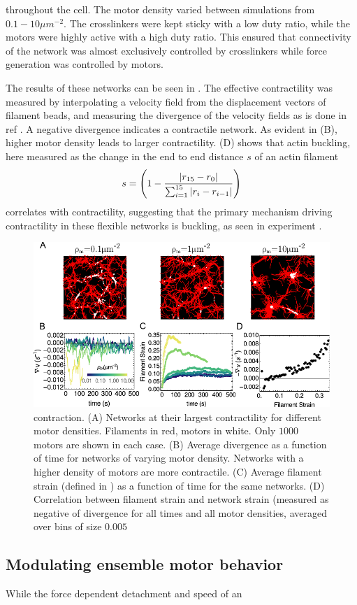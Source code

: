 \documentclass[12pt]{article} \usepackage{times} \usepackage{graphicx}
\begin{document}
  throughout the cell. The motor density varied between simulations from
  $0.1-10\mu m^{-2}$.  The crosslinkers were kept sticky with a low duty ratio,
  while the motors were highly active with a high duty ratio. This ensured that
  connectivity of the network was almost exclusively controlled by crosslinkers
  while force generation was controlled by motors.  \par The results of these
  networks can be seen in . The effective contractility was
  measured by interpolating a velocity field from the displacement vectors of
  filament beads, and measuring the divergence of the velocity fields as is
  done in ref \cite{murrell2014}. A negative divergence indicates a contractile
  network. As evident in (B), higher motor density leads to
  larger contractility. (D) shows that actin buckling, here
  measured as the change in the end to end distance $s$ of an actin filament
  \begin{equation} s = \left(1 -
    {|r_{15}-r_0|\over\sum_{i=1}^{15}{|r_i-r_{i-1}|}}\right)
    \label{eqn:fil_strain} \end{equation} correlates with contractility,
  suggesting that the primary mechanism driving contractility in these flexible
  networks is buckling, as seen in experiment \cite{murrell2012}.
  \begin{figure}[H] \centering
    \includegraphics[scale=1.2]{figs/divergence/div_fig.pdf} \caption{%
      \label{fig:contract}%
      contraction. (A) Networks at their largest contractility for different
      motor densities. Filaments in red, motors in white. Only $1000$ motors
      are shown in each case.  (B) Average divergence as a function of time for
      networks of varying motor density. Networks with a higher density of
      motors are more contractile.  (C) Average filament strain (defined in
      ) as a function of time for the same networks.  (D)
      Correlation between filament strain and network strain (measured as
      negative of divergence for all times and all motor densities, averaged
      over bins of size $0.005$ } \end{figure}  \subsection{Modulating ensemble
    motor behavior} While the force dependent detachment and speed of an
\end{document}

